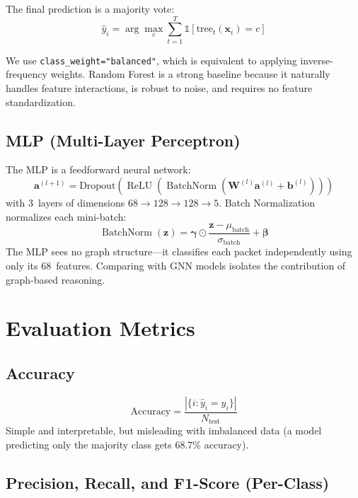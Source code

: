 \documentclass[conference]{IEEEtran}
\newcommand{\vect}[1]{\bm{#1}}
\newcommand{\mat}[1]{\mathbf{#1}}
\DeclareMathOperator{\ReLU}{ReLU}
\DeclareMathOperator{\BN}{BatchNorm}
\begin{document}
The final prediction is a majority vote:
\begin{equation}
    \hat{y}_i = \arg\max_c \sum_{t=1}^{T} \mathbb{1}[\text{tree}_t(\vect{x}_i) = c]
\end{equation}

We use \texttt{class\_weight="balanced"}, which is equivalent to applying inverse-frequency weights. Random Forest is a strong baseline because it naturally handles feature interactions, is robust to noise, and requires no feature standardization.

\subsection{MLP (Multi-Layer Perceptron)}

The MLP is a feedforward neural network:
\begin{equation}
    \vect{a}^{(l+1)} = \text{Dropout}\!\left(\ReLU\!\left(\BN\!\left(\mat{W}^{(l)} \vect{a}^{(l)} + \vect{b}^{(l)}\right)\right)\right)
\end{equation}
with 3~layers of dimensions $68 \to 128 \to 128 \to 5$. Batch Normalization normalizes each mini-batch:
\begin{equation}
    \BN(\vect{z}) = \bm{\gamma} \odot \frac{\vect{z} - \mu_{\text{batch}}}{\sigma_{\text{batch}}} + \bm{\beta}
\end{equation}
The MLP sees no graph structure---it classifies each packet independently using only its 68~features. Comparing with GNN models isolates the contribution of graph-based reasoning.

\section{Evaluation Metrics}
\label{sec:metrics}

\subsection{Accuracy}
\begin{equation}
    \text{Accuracy} = \frac{|\{i : \hat{y}_i = y_i\}|}{N_{\text{test}}}
\end{equation}
Simple and interpretable, but misleading with imbalanced data (a model predicting only the majority class gets 68.7\% accuracy).

\subsection{Precision, Recall, and F1-Score (Per-Class)}
\end{document}

